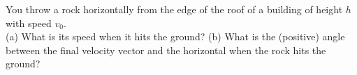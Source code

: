 You throw a rock horizontally from the edge of the roof of a building of height
$h$ with speed $v_0$.\\
%
(a) What is its speed when it hits the ground?\answercheck\hwendpart
%
(b) What is the (positive) angle
between the final velocity vector and the horizontal when the rock
hits the ground?\answercheck
